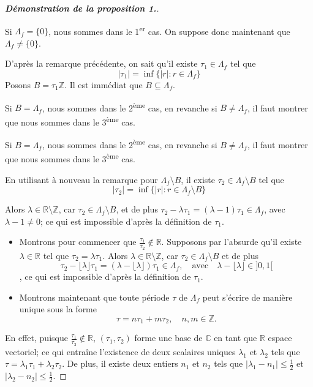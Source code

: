 \documentclass[12pt]{article}
\begin{document}
\begin{proof}[\textbf{Démonstration de la proposition 1.}] \

Si \( \Lambda_f = \{0\} \), nous sommes dans le 1\textsuperscript{er} cas. On suppose donc maintenant que \( \Lambda_f \neq \{0\} \).

D'après la remarque précédente, on sait qu'il existe \( \tau_1 \in \Lambda_f \) tel que
\[
|\tau_1| = \inf\{|r| : r \in \Lambda_f\}
\]
Posons \( B = \tau_1\mathbb{Z} \). Il est immédiat que \( B \subseteq \Lambda_f \).

Si \( B = \Lambda_f \), nous sommes dans le 2\textsuperscript{ème} cas, en revanche si \( B \neq \Lambda_f \), il faut montrer que nous sommes dans le 3\textsuperscript{ème} cas.

Si \( B = \Lambda_f \), nous sommes dans le 2\textsuperscript{ème} cas, en revanche si \( B \neq \Lambda_f \), il faut montrer que nous sommes dans le 3\textsuperscript{ème} cas.

En utilisant à nouveau la remarque pour \( \Lambda_f \setminus B  \), il existe \( \tau_2 \in \Lambda_f \setminus B  \) tel que
\[
|\tau_2| = \inf\{|r| : r \in \Lambda_f \setminus B \}
\]

Alors \( \lambda \in \mathbb{R}\setminus\mathbb{Z} \), car \( \tau_2 \in \Lambda_f \setminus B  \), et de plus \( \tau_2 - \lambda\tau_1 = (\lambda - 1)\tau_1 \in \Lambda_f \), avec \( \lambda - 1 \neq 0 \); ce qui est impossible d'après la définition de \( \tau_1 \).
\begin{itemize}
    \item Montrons pour commencer que \( \frac{\tau_1}{\tau_2} \notin \mathbb{R} \). Supposons par l'absurde qu'il existe \( \lambda \in \mathbb{R} \) tel que \( \tau_2 = \lambda\tau_1 \).
    Alors \( \lambda \in \mathbb{R} \setminus \mathbb{Z} \), car \( \tau_2 \in \Lambda_f \setminus B \) et de plus  \[
    \tau_2 - \lfloor \lambda \rfloor \tau_1 = (\lambda - \lfloor \lambda \rfloor) \tau_1 \in \Lambda_f, \quad \text{avec} \quad \lambda - \lfloor \lambda \rfloor \in ]0, 1[
        \], ce qui est impossible d’après la définition de \( \tau_1 \).
    \item Montrons maintenant que toute période \( \tau \) de \( \Lambda_f \) peut s'écrire de manière unique sous la forme
    \[
        \tau = n\tau_1 + m\tau_2, \quad n, m \in \mathbb{Z}.
        \]
    \end{itemize}

    En effet, puisque \(\frac{\tau_1}{\tau_2} \notin \mathbb{R}\), \((\tau_1, \tau_2)\) forme une base de \(\mathbb{C}\) en tant que \(\mathbb{R}\) espace vectoriel; ce qui entraîne l’existence de deux scalaires uniques \(\lambda_1\) et \(\lambda_2\) tels que \(\tau = \lambda_1 \tau_1 + \lambda_2 \tau_2\). De plus, il existe deux entiers \(n_1\) et \(n_2\) tels que \(|\lambda_1 - n_1| \leq \frac{1}{2}\) et \(|\lambda_2 - n_2| \leq \frac{1}{2}\).
    

\end{proof}
\end{document}
